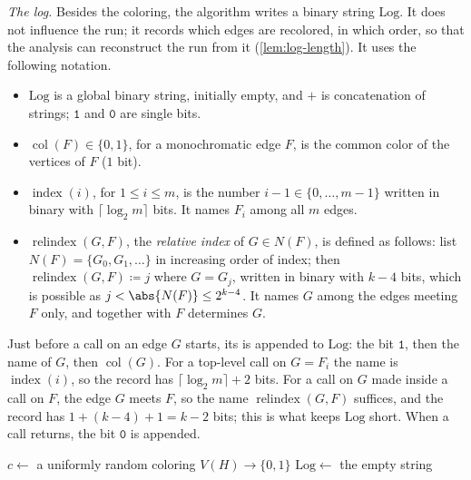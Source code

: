 \emph{The log.} Besides the coloring, the algorithm writes a binary string \(\mathrm{Log}\). It does not influence the run; it records which edges are recolored, in which order, so that the analysis can reconstruct the run from it (\autoref{lem:log-length}). It uses the following notation.

\begin{notation}\label{nota:log}
    \leavevmode
    \begin{itemize}
        \item \(\mathrm{Log}\) is a global binary string, initially empty, and \(+\) is concatenation of strings; \(\texttt{1}\) and \(\texttt{0}\) are single bits.
        \item \(\operatorname{col}(F) \in \{0, 1\}\), for a monochromatic edge \(F\), is the common color of the vertices of \(F\) (\(1\) bit).
        \item \(\operatorname{index}(i)\), for \(1 \le i \le m\), is the number \(i - 1 \in \{0, \ldots, m-1\}\) written in binary with \(\lceil \log_{2} m \rceil\) bits. It names \(F_{i}\) among all \(m\) edges.
        \item \(\operatorname{relindex}(G, F)\), the \emph{relative index} of \(G \in N(F)\), is defined as follows: list \(N(F) = \{ G_{0}, G_{1}, \ldots \}\) in increasing order of index; then \(\operatorname{relindex}(G, F) \coloneqq j\) where \(G = G_{j}\), written in binary with \(k - 4\) bits, which is possible as \(j < \abs{N(F)} \le 2^{k-4}\). It names \(G\) among the edges meeting \(F\) only, and together with \(F\) determines \(G\).
    \end{itemize}
\end{notation}

Just before a call on an edge \(G\) starts, its  is appended to \(\mathrm{Log}\): the bit \(\texttt{1}\), then the name of \(G\), then \(\operatorname{col}(G)\). For a top-level call on \(G = F_{i}\) the name is \(\operatorname{index}(i)\), so the record has \(\lceil \log_{2} m \rceil + 2\) bits. For a call on \(G\) made inside a call on \(F\), the edge \(G\) meets \(F\), so the name \(\operatorname{relindex}(G, F)\) suffices, and the record has \(1 + (k - 4) + 1 = k - 2\) bits; this is what keeps \(\mathrm{Log}\) short. When a call returns, the bit \(\texttt{0}\) is appended.

\begin{algorithm}[H]
    \caption{\textsc{LLL-Painter}\((H)\)}\label{alg:lll-painter}
    \(c \gets\) a uniformly random coloring \(V(H) \to \{0, 1\}\)\;
    \(\mathrm{Log} \gets\) the empty string\;
\end{algorithm}

